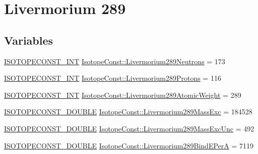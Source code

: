 \hypertarget{group___isotope_const-_livermorium-_lv289}{}\section{Livermorium 289}
\label{group___isotope_const-_livermorium-_lv289}
\subsection*{Variables}
\begin{DoxyCompactItemize}
\item 
\mbox{\hyperlink{group___isotope_const-_macros_ga5f18360b3e99483a35c32d789e62621c}{I\+S\+O\+T\+O\+P\+E\+C\+O\+N\+S\+T\+\_\+\+I\+NT}} \mbox{\hyperlink{group___isotope_const-_livermorium-_lv289_ga69a5c6e10b51d7e708054447a1142b76}{Isotope\+Const\+::\+Livermorium289\+Neutrons}} = 173
\item 
\mbox{\hyperlink{group___isotope_const-_macros_ga5f18360b3e99483a35c32d789e62621c}{I\+S\+O\+T\+O\+P\+E\+C\+O\+N\+S\+T\+\_\+\+I\+NT}} \mbox{\hyperlink{group___isotope_const-_livermorium-_lv289_gab710c46596f0002b1f6acda11e062213}{Isotope\+Const\+::\+Livermorium289\+Protons}} = 116
\item 
\mbox{\hyperlink{group___isotope_const-_macros_ga5f18360b3e99483a35c32d789e62621c}{I\+S\+O\+T\+O\+P\+E\+C\+O\+N\+S\+T\+\_\+\+I\+NT}} \mbox{\hyperlink{group___isotope_const-_livermorium-_lv289_gabfb5e10cd6de7ff74fab496bb41d8f66}{Isotope\+Const\+::\+Livermorium289\+Atomic\+Weight}} = 289
\item 
\mbox{\hyperlink{group___isotope_const-_macros_ga8f45a7272ce02c0b4c65c44636ed719a}{I\+S\+O\+T\+O\+P\+E\+C\+O\+N\+S\+T\+\_\+\+D\+O\+U\+B\+LE}} \mbox{\hyperlink{group___isotope_const-_livermorium-_lv289_ga8be64d572a2d2c87bcd8da6c6b25b5f6}{Isotope\+Const\+::\+Livermorium289\+Mass\+Exc}} = 184528
\item 
\mbox{\hyperlink{group___isotope_const-_macros_ga8f45a7272ce02c0b4c65c44636ed719a}{I\+S\+O\+T\+O\+P\+E\+C\+O\+N\+S\+T\+\_\+\+D\+O\+U\+B\+LE}} \mbox{\hyperlink{group___isotope_const-_livermorium-_lv289_gad00bb3564a81bbefd8572ef826f8c83d}{Isotope\+Const\+::\+Livermorium289\+Mass\+Exc\+Unc}} = 492
\item 
\mbox{\hyperlink{group___isotope_const-_macros_ga8f45a7272ce02c0b4c65c44636ed719a}{I\+S\+O\+T\+O\+P\+E\+C\+O\+N\+S\+T\+\_\+\+D\+O\+U\+B\+LE}} \mbox{\hyperlink{group___isotope_const-_livermorium-_lv289_ga54b11fc087bd5f08887d5e1116260ed8}{Isotope\+Const\+::\+Livermorium289\+Bind\+E\+PerA}} = 7119

\end{DoxyCompactItemize}
